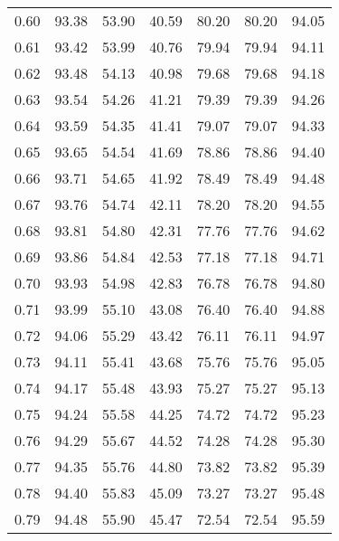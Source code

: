 \begin{tabular}{|c|c|c|c|c|c|c|}
      0.60 &     93.38 &     53.90 &      40.59 &   80.20 &      80.20 &         94.05 \\
      0.61 &     93.42 &     53.99 &      40.76 &   79.94 &      79.94 &         94.11 \\
      0.62 &     93.48 &     54.13 &      40.98 &   79.68 &      79.68 &         94.18 \\
      0.63 &     93.54 &     54.26 &      41.21 &   79.39 &      79.39 &         94.26 \\
      0.64 &     93.59 &     54.35 &      41.41 &   79.07 &      79.07 &         94.33 \\
      0.65 &     93.65 &     54.54 &      41.69 &   78.86 &      78.86 &         94.40 \\
      0.66 &     93.71 &     54.65 &      41.92 &   78.49 &      78.49 &         94.48 \\
      0.67 &     93.76 &     54.74 &      42.11 &   78.20 &      78.20 &         94.55 \\
      0.68 &     93.81 &     54.80 &      42.31 &   77.76 &      77.76 &         94.62 \\
      0.69 &     93.86 &     54.84 &      42.53 &   77.18 &      77.18 &         94.71 \\
      0.70 &     93.93 &     54.98 &      42.83 &   76.78 &      76.78 &         94.80 \\
      0.71 &     93.99 &     55.10 &      43.08 &   76.40 &      76.40 &         94.88 \\
      0.72 &     94.06 &     55.29 &      43.42 &   76.11 &      76.11 &         94.97 \\
      0.73 &     94.11 &     55.41 &      43.68 &   75.76 &      75.76 &         95.05 \\
      0.74 &     94.17 &     55.48 &      43.93 &   75.27 &      75.27 &         95.13 \\
      0.75 &     94.24 &     55.58 &      44.25 &   74.72 &      74.72 &         95.23 \\
      0.76 &     94.29 &     55.67 &      44.52 &   74.28 &      74.28 &         95.30 \\
      0.77 &     94.35 &     55.76 &      44.80 &   73.82 &      73.82 &         95.39 \\
      0.78 &     94.40 &     55.83 &      45.09 &   73.27 &      73.27 &         95.48 \\
      0.79 &     94.48 &     55.90 &      45.47 &   72.54 &      72.54 &         95.59 \\

\end{tabular}
